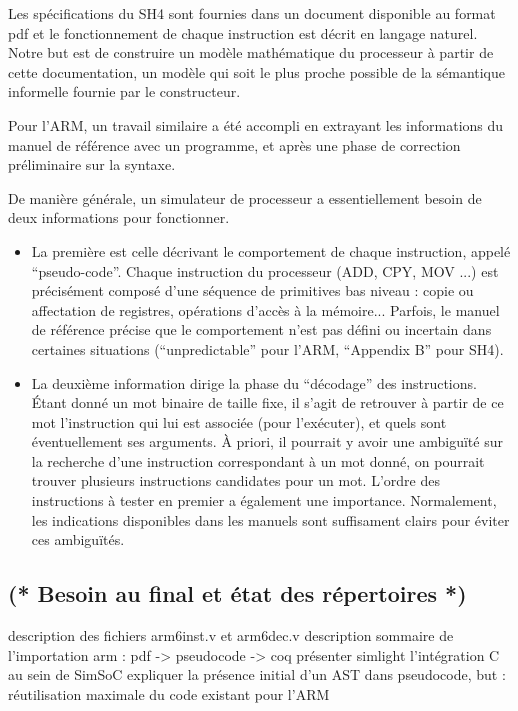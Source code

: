 \documentclass[a4paper, 11pt]{article}
\begin{document}
Les spécifications du SH4 sont fournies dans un document disponible au format pdf et le fonctionnement de chaque instruction est décrit en langage naturel. Notre but est de construire un modèle mathématique du processeur à partir de cette documentation, un modèle qui soit le plus proche possible de la sémantique informelle fournie par le constructeur.

Pour l'ARM, un travail similaire a été accompli en extrayant les informations du manuel de référence avec un programme, et après une phase de correction préliminaire sur la syntaxe.

De manière générale, un simulateur de processeur a essentiellement besoin de deux informations pour fonctionner.
\begin{itemize}
\item La première est celle décrivant le comportement de chaque instruction, appelé ``pseudo-code''. Chaque instruction du processeur (ADD, CPY, MOV ...) est précisément composé d'une séquence de primitives bas niveau : copie ou affectation de registres, opérations d'accès à la mémoire... Parfois, le manuel de référence précise que le comportement n'est pas défini ou incertain dans certaines situations (``unpredictable'' pour l'ARM, ``Appendix B'' pour SH4).
\item La deuxième information dirige la phase du ``décodage'' des instructions. Étant donné un mot binaire de taille fixe, il s'agit de retrouver à partir de ce mot l'instruction qui lui est associée (pour l'exécuter), et quels sont éventuellement ses arguments. À priori, il pourrait y avoir une ambiguïté sur la recherche d'une instruction correspondant à un mot donné, on pourrait trouver plusieurs instructions candidates pour un mot. L'ordre des instructions à tester en premier a également une importance. Normalement, les indications disponibles dans les manuels sont suffisament clairs pour éviter ces ambiguïtés.
\end{itemize}

  \subsection{(* Besoin au final et état des répertoires *)}
description des fichiers arm6inst.v et arm6dec.v
description sommaire de l'importation arm : pdf -> pseudocode -> coq
présenter simlight
l'intégration C au sein de SimSoC
expliquer la présence initial d'un AST dans pseudocode, but : réutilisation maximale du code existant pour l'ARM 
\end{document}
